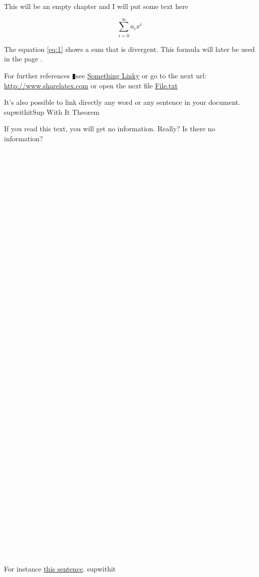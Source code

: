 \documentclass{book}
\newcommand{\df}[1]{#1}
\newcommand{\rf}[1]{#1}
\newcommand{\pipe}{$\vrectangleblack$}
\begin{document}
This will be an empty chapter and I will put some text here

\begin{equation}
\label{eq:1}
\sum_{i=0}^{\infty} a_i x^i
\end{equation}

The equation \ref{eq:1} shows a sum that is divergent. This formula 
will later be used in the page \pageref{second}.

For further references \pipe see \href{http://www.sharelatex.com}{Something 
Linky} or go to the next url: \url{http://www.sharelatex.com} or open 
the next file \href{run:./file.txt}{File.txt}

It's also possible to link directly any word or 
\hypertarget{thesentence}{any sentence} in your document.
\df{supwithit}{Sup With It Theorem}

If you read this text, you will get no information.  Really?  
Is there no information?
\\ \\ \\ \\ \\ \\ \\ \\ \\ \\ \\ \\ \\ \\ \\ \\ \\ \\ \\ \\ \\ \\ \\ \\ \\ \\ \\ \\ \\ \\ \\ \\ \\ \\ \\ \\ \\ \\ \\ \\ \\ \\ \\ \\ 
For instance \hyperlink{thesentence}{this sentence}.
\rf{supwithit}
 
\end{document}
